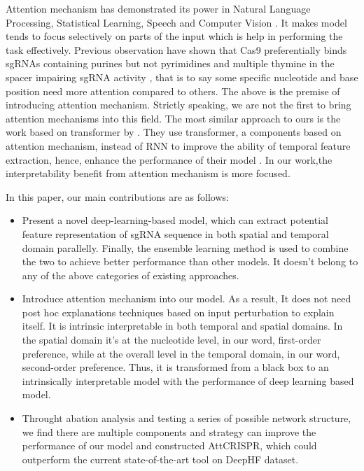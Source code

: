 \documentclass{bioinfo}
\begin{document}
Attention mechanism has demonstrated its power in Natural Language Processing, Statistical Learning, Speech and Computer Vision \citep{chaudhari2019an}. 
 It makes model tends to focus selectively on parts of the input which is help in performing the task effectively. 
 Previous observation have shown that Cas9 preferentially binds sgRNAs containing purines but not pyrimidines \citep{wang2014genetic} and multiple thymine in the spacer impairing sgRNA activity \citep{wu2014genome-wide}, 
 that is to say some specific nucleotide and base position need more attention compared to others. 
 The above is the premise of introducing attention mechanism. Strictly speaking, we are not the first to bring attention mechanisms into this field. 
 The most similar approach to ours is the work based on transformer by \citeauthor{Liu2019}. 
 They use transformer, a components based on attention mechanism, instead of RNN to improve the ability of temporal feature extraction, hence, enhance the performance of their model \citep{Liu2019,vaswani2017attention}. 
 In our work,the interpretability benefit from attention mechanism is more focused.

In this paper, our main contributions are as follows:\vspace*{1pt}
\begin{itemize}
    \item Present a novel deep-learning-based model, which can extract potential feature representation of sgRNA sequence in both spatial and temporal domain parallelly. 
    Finally, the ensemble learning method is used to combine the two to achieve better performance than other models.
    It doesn't belong to any of the above categories of existing approaches.
    \item Introduce attention mechanism into our model. 
    As a result, It does not need post hoc explanations techniques based on input perturbation to explain itself. 
    It is intrinsic interpretable in both temporal and spatial domains.
    In the spatial domain it's at the nucleotide level, in our word, first-order preference, 
    while at the overall level in the temporal domain, in our word, second-order preference. 
    Thus, it is transformed from a black box to an intrinsically interpretable model with the performance of deep learning based model. 
    \item Throught abation analysis and testing a series of possible network structure, 
    we find there are multiple components and strategy can improve the performance of our model and constructed AttCRISPR, 
    which could outperform the current state-of-the-art tool on DeepHF dataset.\vspace*{1pt}
\end{itemize}
\end{document}
